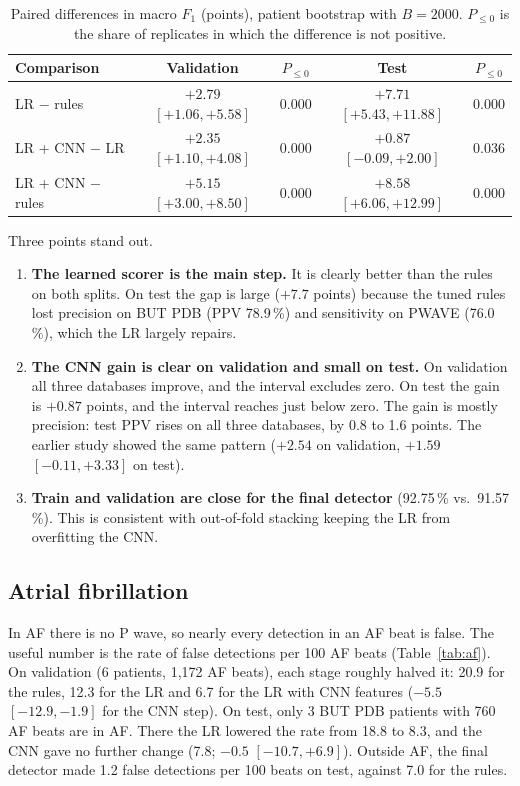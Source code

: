 \documentclass[11pt,a4paper]{article}
\begin{document}
\begin{table}[ht]
\centering
\caption{Paired differences in macro $F_1$ (points), patient bootstrap with $B = 2000$. $P_{\le 0}$ is the share of replicates in which the difference is not positive.}
\label{tab:diff}
\begin{tabular}{lcccc}
\toprule
Comparison & Validation & $P_{\le 0}$ & Test & $P_{\le 0}$ \\
\midrule
LR $-$ rules & $+2.79$ $[+1.06, +5.58]$ & 0.000 & $+7.71$ $[+5.43, +11.88]$ & 0.000 \\
LR + CNN $-$ LR & $+2.35$ $[+1.10, +4.08]$ & 0.000 & $+0.87$ $[-0.09, +2.00]$ & 0.036 \\
LR + CNN $-$ rules & $+5.15$ $[+3.00, +8.50]$ & 0.000 & $+8.58$ $[+6.06, +12.99]$ & 0.000 \\
\bottomrule
\end{tabular}
\end{table}

Three points stand out.
\begin{enumerate}
\item \textbf{The learned scorer is the main step.} It is clearly better than the rules on both splits. On test the gap is large ($+7.7$ points) because the tuned rules lost precision on BUT PDB (PPV 78.9\,\%) and sensitivity on PWAVE (76.0\,\%), which the LR largely repairs.
\item \textbf{The CNN gain is clear on validation and small on test.} On validation all three databases improve, and the interval excludes zero. On test the gain is $+0.87$ points, and the interval reaches just below zero. The gain is mostly precision: test PPV rises on all three databases, by 0.8 to 1.6 points. The earlier study showed the same pattern ($+2.54$ on validation, $+1.59$ $[-0.11, +3.33]$ on test).
\item \textbf{Train and validation are close for the final detector} (92.75\,\% vs.\ 91.57\,\%). This is consistent with out-of-fold stacking keeping the LR from overfitting the CNN.
\end{enumerate}

\subsection{Atrial fibrillation}

In AF there is no P wave, so nearly every detection in an AF beat is false. The useful number is the rate of false detections per 100 AF beats (Table~\ref{tab:af}). On validation (6 patients, 1,172 AF beats), each stage roughly halved it: 20.9 for the rules, 12.3 for the LR and 6.7 for the LR with CNN features ($-5.5$ $[-12.9, -1.9]$ for the CNN step). On test, only 3 BUT PDB patients with 760 AF beats are in AF. There the LR lowered the rate from 18.8 to 8.3, and the CNN gave no further change (7.8; $-0.5$ $[-10.7, +6.9]$). Outside AF, the final detector made 1.2 false detections per 100 beats on test, against 7.0 for the rules.
\end{document}
